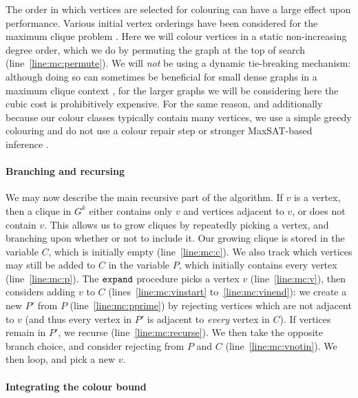 \documentclass[letterpaper]{article}
\newcommand{\mcline}[1]{line~\ref{line:mc:#1}}
\newcommand{\mclinerange}[2]{lines~\ref{line:mc:#1} to~\ref{line:mc:#2}}
\newcommand{\expand}{\FuncSty{expand}}
\begin{document}
The order in which vertices are selected for colouring can have a large effect upon performance.
Various initial vertex orderings have been considered for the maximum clique problem
\cite{Prosser:2012,DBLP:conf/lion/SegundoLB14}. Here we will colour vertices in a static
non-increasing degree order, which we do by permuting the graph at the top of search
(\mcline{permute}). We will \emph{not} be using a dynamic tie-breaking mechanism: although doing so
can sometimes be beneficial for small dense graphs in a maximum clique context \cite{Tomita:2010},
for the larger graphs we will be considering here the cubic cost is prohibitively expensive. For the
same reason, and additionally because our colour classes typically contain many vertices, we use a
simple greedy colouring and do not use a colour repair step \cite{Tomita:2010} or stronger
MaxSAT-based inference \cite{DBLP:journals/cor/SegundoNB15,DBLP:conf/lion/LiJX15}.

\paragraph{Branching and recursing}

We may now describe the main recursive part of the algorithm. If $v$ is a vertex, then a clique in
$G^k$ either contains only $v$ and vertices adjacent to $v$, or does not contain $v$. This allows us
to grow cliques by repeatedly picking a vertex, and branching upon whether or not to include it. Our
growing clique is stored in the variable $C$, which is initially empty (\mcline{c}). We also track
which vertices may still be added to $C$ in the variable $P$, which initially contains every vertex
(\mcline{p}). The $\expand$ procedure picks a vertex $v$ (\mcline{v}), then considers adding $v$ to
$C$ (\mclinerange{vinstart}{vinend}): we create a new $P'$ from $P$ (\mcline{pprime}) by
rejecting vertices which are not adjacent to $v$ (and thus every vertex in $P'$ is adjacent to
\emph{every} vertex in $C$). If vertices remain in $P'$, we recurse (\mcline{recurse}). We then take
the opposite branch choice, and consider rejecting from $P$ and $C$
(\mcline{vnotin}). We then loop, and pick a new $v$.

\paragraph{Integrating the colour bound}
\end{document}
